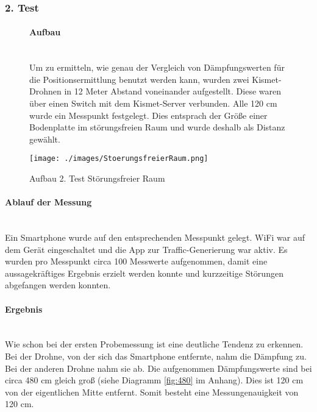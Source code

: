 \documentclass[a4paper]{spie}  %
\begin{document}
\subsubsection{2. Test}\label{testNr2}

\begin{figure}[H]
\begin{minipage}[t]{0.4\textwidth}
\vspace{0pt}
\paragraph{Aufbau}\mbox{}\\
Um zu ermitteln, wie genau der Vergleich von Dämpfungswerten für die Positionsermittlung benutzt werden kann, wurden zwei Kismet-Drohnen in 12 Meter Abstand voneinander aufgestellt. Diese waren über einen Switch mit dem Kismet-Server verbunden. Alle 120 cm wurde ein Messpunkt festgelegt. Dies entsprach der Größe einer Bodenplatte im störungsfreien Raum und wurde deshalb als Distanz gewählt.
\end{minipage}
\hfill
\begin{minipage}[t]{0.5\textwidth}
\vspace{0pt}
		\texttt{[image: ./images/StoerungsfreierRaum.png]}
		\caption{Aufbau 2. Test Störungsfreier Raum}
		\label{fig:test2}
\end{minipage}
\end{figure}

\paragraph{Ablauf der Messung}\mbox{}\\
Ein Smartphone wurde auf den entsprechenden Messpunkt gelegt. WiFi war auf dem Gerät eingeschaltet und die App zur Traffic-Generierung war aktiv. Es wurden pro Messpunkt circa 100 Messwerte aufgenommen, damit eine aussagekräftiges Ergebnis erzielt werden konnte und kurzzeitige Störungen abgefangen werden konnten.

\paragraph{Ergebnis}\mbox{}\\
Wie schon bei der ersten Probemessung ist eine deutliche Tendenz zu erkennen. Bei der Drohne, von der sich das Smartphone entfernte, nahm die Dämpfung zu. Bei der anderen Drohne nahm sie ab. Die aufgenommen Dämpfungswerte sind bei circa 480 cm gleich groß (siehe Diagramm \ref{fig:480} im Anhang). Dies ist 120 cm von der eigentlichen Mitte entfernt. Somit besteht eine Messungenauigkeit von 120 cm.
\end{document}
